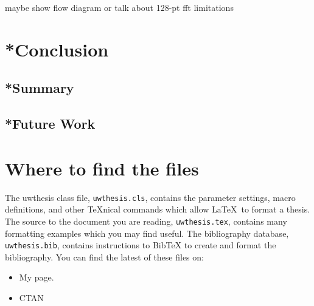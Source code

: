 \documentclass [11pt, proquest] {uwthesis}[2015/03/03]
\begin{document}
maybe show flow diagram or talk about 128-pt fft limitations




\chapter{*Conclusion}

\section{*Summary}

\section{*Future Work}



%
%
\nocite{*}   %


%
%
\appendix
\raggedbottom\sloppy
 
 
\chapter{Where to find the files}
 
The uwthesis class file, {\tt uwthesis.cls}, contains the parameter settings,
macro definitions, and other \TeX nical commands which
allow \LaTeX\ to format a thesis.  
The source to
the document you are reading, {\tt uwthesis.tex},
contains many formatting examples
which you may find useful.
The bibliography database, {\tt uwthesis.bib}, contains instructions
to BibTeX to create and format the bibliography.
You can find the latest of these files on:

\begin{itemize}
\item My page.
\begin{description}
\item[] \verb%http://staff.washington.edu/fox/tex/uwthesis.html%
\end{description}

\item CTAN

\end{itemize}

\end{document}
